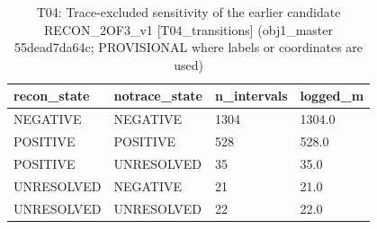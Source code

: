 \begin{table}[htbp]
\centering
\caption{T04: Trace-excluded sensitivity of the earlier candidate RECON\_2OF3\_v1 [T04\_transitions] (obj1\_master 55dead7da64c; PROVISIONAL where labels or coordinates are used)}
\begin{tabular}{llll}
\toprule
recon\_state & notrace\_state & n\_intervals & logged\_m \\
\midrule
NEGATIVE & NEGATIVE & 1304 & 1304.0 \\
POSITIVE & POSITIVE & 528 & 528.0 \\
POSITIVE & UNRESOLVED & 35 & 35.0 \\
UNRESOLVED & NEGATIVE & 21 & 21.0 \\
UNRESOLVED & UNRESOLVED & 22 & 22.0 \\
\bottomrule
\end{tabular}
\end{table}
